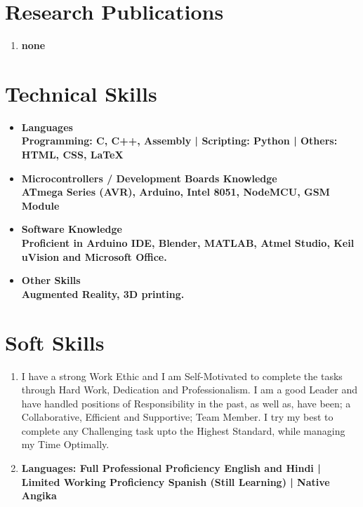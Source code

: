 \documentclass[11pt]{article}
\begin{document}
\begin{minipage}{18cm}
\begin{itemize}[leftmargin=*]
\end{itemize}

\section{Research Publications}
\begin{enumerate}[leftmargin=*]
\item \bfseries none\\
\end{enumerate}

\section{Technical Skills}
\begin{itemize}[leftmargin=*]
\item \bfseries Languages\\
Programming: \mdseries C, C++, Assembly | 
\bfseries Scripting: \mdseries Python | 
\bfseries Others: \mdseries HTML, CSS, \LaTeX\\

\item \bfseries Microcontrollers / Development Boards Knowledge\\
\mdseries ATmega Series (AVR), Arduino, Intel 8051, NodeMCU, GSM Module\\

\item \bfseries Software Knowledge\\
\mdseries Proficient in Arduino IDE, Blender, MATLAB, Atmel Studio, Keil uVision and Microsoft Office.\\

\item \bfseries Other Skills\\
\mdseries Augmented Reality, 3D printing.\\
\end{itemize}

\fontsize{10pt}{13pt}\selectfont
\section{Soft Skills}
\begin{enumerate}[leftmargin=*]
\item  I have a strong Work Ethic and I am Self-Motivated to complete the tasks through Hard Work, Dedication and Professionalism. I am a good Leader and have handled positions of Responsibility in the past, as well as, have been; a Collaborative, Efficient and Supportive; Team Member. I try my best to complete any Challenging task upto the Highest Standard, while managing my Time Optimally.\\

\item \bfseries Languages: 
Full Professional Proficiency \mdseries English and Hindi | \bfseries Limited Working Proficiency \mdseries Spanish (Still Learning) | \bfseries Native \mdseries Angika
\end{enumerate}

\end{minipage}
\end{document}
